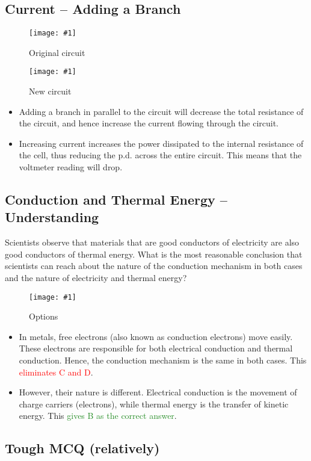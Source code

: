 \documentclass[a4paper,12pt]{article}
\newcommand{\img}[4]{\begin{center}
  \begin{figure}[H]
    \centering
    \texttt{[image: \#1]}
    \caption{#3}
    \label{fig:#4}
  \end{figure}
\end{center}}
\begin{document}
\pagebreak

\subsection{Current -- Adding a Branch}
\img{ex/6.png}{0.6}{Original circuit}{ex6}
\img{ex/7.png}{0.6}{New circuit}{ex7}

\begin{itemize}
  \item Adding a branch in parallel to the circuit will decrease the total resistance of the circuit, and hence increase the current flowing through the circuit.
  \item Increasing current increases the power dissipated to the internal resistance of the cell, thus reducing the p.d. across the entire circuit. This means that the voltmeter reading will drop.
\end{itemize}

\pagebreak

\subsection{Conduction and Thermal Energy -- Understanding}

Scientists observe that materials that are good conductors of electricity are also good conductors of thermal energy. What is the most reasonable conclusion that scientists can reach about the nature of the conduction mechanism in both cases and the nature of electricity and thermal energy?

\img{ex/8.png}{0.8}{Options}{ex8}

\begin{itemize}
  \item In metals, free electrons (also known as conduction electrons) move easily. These electrons are responsible for both electrical conduction and thermal conduction. Hence, the conduction mechanism is the same in both cases. This \textcolor{red}{eliminates C and D}.
  \item However, their nature is different. Electrical conduction is the movement of charge carriers (electrons), while thermal energy is the transfer of kinetic energy. This \textcolor{ForestGreen}{gives B as the correct answer}.
\end{itemize}

\pagebreak

\subsection{Tough MCQ (relatively)}
\end{document}
